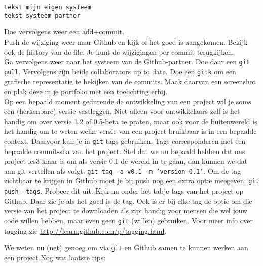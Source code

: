 \begin{verbatim}
tekst mijn eigen systeem
tekst systeem partner
\end{verbatim}

Doe vervolgens weer een add+commit. \\

\step Push de wijziging weer naar Github en kijk of het goed is
aangekomen. Bekijk ook de history van de file. Je kunt de wijzigingen
per commit terugkijken. \\

\step Ga vervolgens weer naar het systeem van de Github-partner. Doe
daar een {\tt git pull}. Vervolgens zijn beide collaborators up to
date. Doe een {\tt gitk} om een grafische representatie te bekijken
van de commits. Maak daarvan een screenshot en plak deze in je
portfolio met een toelichting erbij. \\

\step Op een bepaald moment gedurende de ontwikkeling van een project
wil je soms een (herkenbare) versie vastleggen. Niet alleen voor
ontwikkelaars zelf is het handig om over versie 1.2 of 0.5-beta te
praten, maar ook voor de buitenwereld is het handig om te weten welke
versie van een project bruikbaar is in een bepaalde context. Daarvoor
kun je in {\tt git} tags gebruiken. Tags corresponderen met een
bepaalde commit-sha van het project. Stel dat we nu bepaald hebben dat
ons project les3 klaar is om als versie 0.1 de wereld in te gaan, dan
kunnen we dat aan git vertellen als volgt: {\tt git tag -a v0.1 -m
  'version 0.1'}. Om de tag zichtbaar te krijgen in Github moet je bij
push nog een extra optie meegeven: {\tt git push --tags}. Probeer dit
uit. Kijk nu onder het tabje tags van het project op Github. Daar zie
je als het goed is de tag. Ook is er bij elke tag de optie om die
versie van het project te downloaden als zip: handig voor mensen die
wel jouw code willen hebben, maar even geen {\tt git} (willen)
gebruiken. Voor meer info over tagging zie
\url{http://learn.github.com/p/tagging.html}. 

We weten nu (net) genoeg om via {\tt git} en Github samen te kunnen werken
aan een project Nog wat laatste tips:

